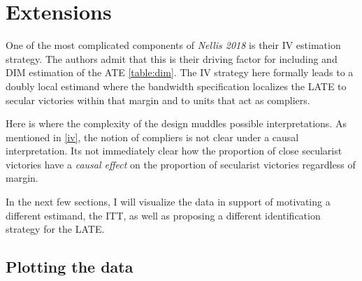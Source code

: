 \documentclass{scrartcl}
\begin{document}




\section{Extensions} \label{extensions}

One of the most complicated components of \textit{Nellis 2018} is their IV estimation strategy.
The authors admit that this is their driving factor for including and DIM estimation of the ATE \ref{table:dim}.
The IV strategy here formally leads to a doubly local estimand where the bandwidth specification localizes the LATE to secular victories within that margin and to units that act as compliers.

Here is where the complexity of the design muddles possible interpretations. As mentioned in \ref{iv}, the notion of compliers is not clear under a causal interpretation. Its not immediately clear how the proportion of close secularist victories have a \textit{causal effect} on the proportion of secularist victories regardless of margin. 

In the next few sections, I will visualize the data in support of motivating a different estimand, the ITT, as well as proposing a different identification strategy for the LATE.

\subsection{Plotting the data}
\end{document}
